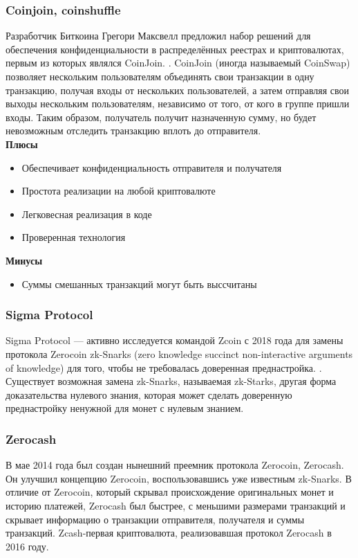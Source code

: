\subsubsection{Coinjoin, coinshuffle}
Разработчик Биткоина Грегори Максвелл предложил набор решений для обеспечения
конфиденциальности в распределённых реестрах и криптовалютах, первым из которых
являлся CoinJoin. \cite{Maurera}. CoinJoin (иногда называемый CoinSwap)
позволяет нескольким пользователям объединять свои транзакции в одну
транзакцию, получая входы от нескольких пользователей, а затем отправляя свои
выходы нескольким пользователям, независимо от того, от кого в группе пришли
входы. Таким образом, получатель получит назначенную сумму, но будет
невозможным отследить транзакцию вплоть до отправителя.\\
\textbf{Плюсы}
\begin{itemize}
    \item Обеспечивает конфиденциальность отправителя и получателя
    \item Простота реализации на любой криптовалюте
    \item Легковесная реализация в коде
    \item Проверенная технология
\end{itemize}
\textbf{Минусы}
\begin{itemize}
    \item Суммы смешанных транзакций могут быть выссчитаны
\end{itemize}

\subsubsection{Sigma Protocol}
Sigma Protocol --- активно исследуется командой Zcoin с 2018 года для замены
протокола Zerocoin zk-Snarks (zero knowledge succinct non-interactive arguments of
knowledge) для того, чтобы не требовалась доверенная
преднастройка. \cite{Groth2015}. Существует возможная замена zk-Snarks,
называемая zk-Starks, другая форма доказательства нулевого знания, которая
может сделать доверенную преднастройку ненужной для монет с нулевым знанием.

\subsubsection{Zerocash}
В мае 2014 года был создан нынешний преемник протокола Zerocoin, Zerocash. Он
улучшил концепцию Zerocoin, воспользовавшись уже известным zk-Snarks. В отличие
от Zerocoin, который скрывал происхождение оригинальных монет и историю
платежей, Zerocash был быстрее, с меньшими размерами транзакций и скрывает
информацию о транзакции отправителя, получателя и суммы транзакций.
Zcash-первая криптовалюта, реализовавшая протокол Zerocash в 2016 году.
\cite{ZerocoinElectricCoinCompany2016}

